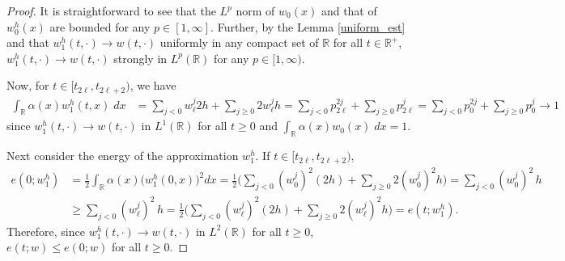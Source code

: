 \documentclass[a4paper,11pt]{article}
\def\R{\mathbb{R}}
\theoremstyle{remark}
\begin{document}
\begin{proof}
It is straightforward to see that the $L^p$ norm of $w_0(x)$ and that of $w_0^h(x)$ are bounded for any $p\in [1,\infty]$. Further, by the Lemma \ref{uniform_est} and that $w_1^h(t,\cdot) \rightarrow w(t,\cdot)$ uniformly in any compact set of $\R$ for all $t\in\R^+$, $w_1^h(t,\cdot) \rightarrow w(t,\cdot)$ strongly in $L^p(\R)$ for any $p \in [1,\infty)$.

Now, for $t\in [t_{2\ell}, t_{2\ell+2})$, we have
\begin{align*}
\int_\R \alpha(x)w_1^h(t,x) \; dx &= \sum_{j<0}w^j_\ell2h + 
\sum_{j\ge0}2w^j_\ell h = \sum_{j<0}p^{2j}_{2\ell} +
\sum_{j\ge0}p^j_{2\ell} = \sum_{j<0}p^{2j}_{0} + \sum_{j\ge0}p^j_{0} \rightarrow 1
\end{align*}
since $w_1^h(t,\cdot) \rightarrow w(t,\cdot)$ in $L^1(\R)$ for all $t\ge0$ and $\int_\R\alpha(x) w_0(x) \; dx=1$.

Next consider the energy of the approximation $w^h_1$. If $t\in [t_{2\ell}, t_{2\ell+2})$,
\begin{align*}
e(0;w^h_1) &= \frac{1}{2} \int_\R \alpha(x) \big(w^h_1(0,x)\big)^2dx = \frac{1}{2} \Big( \sum_{j<0}(w_0^{j})^2(2h) +\sum_{j\ge0}2(w_0^{j})^2h \Big)=\sum_{j<0}(w_0^{j})^2\,h\\
&\ge \sum_{j<0}(w_\ell^{j})^2\,h =\frac{1}{2} \Big( \sum_{j<0}(w_\ell^{j})^2(2h) +\sum_{j\ge0}2(w_\ell^{j})^2h \Big) = e(t;w^h_1).
\end{align*}
Therefore, since $w_1^h(t,\cdot) \rightarrow w(t,\cdot)$ in $L^2(\R)$ for all $t\ge0$, $e(t;w)\le e(0;w)$ for all $t\ge0$.
\end{proof}
\end{document}
